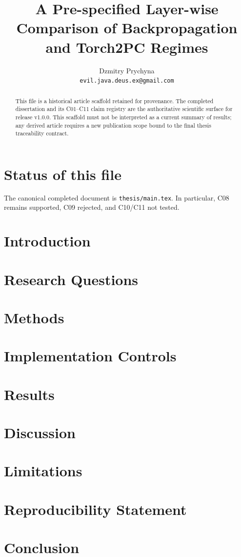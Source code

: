 \documentclass[11pt]{article}
\title{A Pre-specified Layer-wise Comparison of Backpropagation and Torch2PC Regimes}
\author{Dzmitry Prychyna\\\texttt{evil.java.deus.ex@gmail.com}}
\date{}
\begin{document}
\maketitle

\begin{abstract}
This file is a historical article scaffold retained for provenance. The
completed dissertation and its C01--C11 claim registry are the authoritative
scientific surface for release v1.0.0. This scaffold must not be interpreted as
a current summary of results; any derived article requires a new publication
scope bound to the final thesis traceability contract.
\end{abstract}

\section*{Status of this file}
The canonical completed document is \texttt{thesis/main.tex}. In particular,
C08 remains supported, C09 rejected, and C10/C11 not tested.

\section{Introduction}
\section{Research Questions}
\section{Methods}
\section{Implementation Controls}
\section{Results}
\section{Discussion}
\section{Limitations}
\section{Reproducibility Statement}
\section{Conclusion}

\printbibliography
\end{document}
